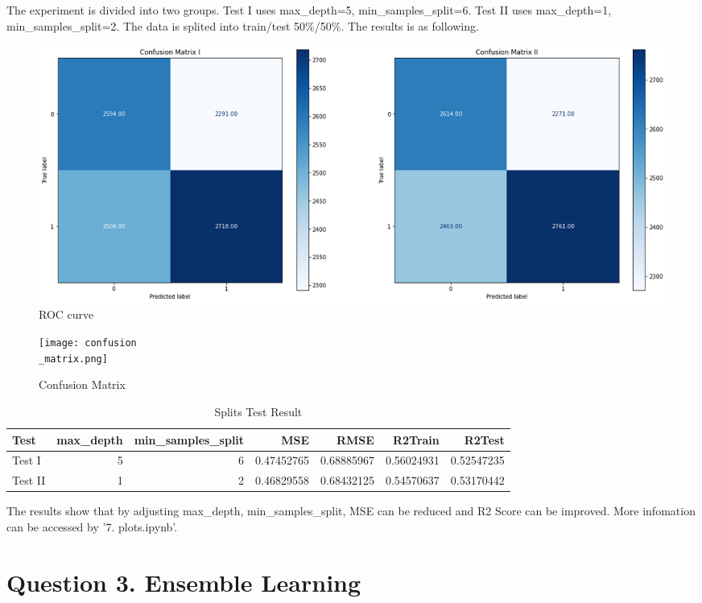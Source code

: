 \documentclass[UTF8]{ctexart}
\begin{document}
The experiment is divided into two groups. Test I uses max\_depth=5, min\_samples\_split=6. Test II uses max\_depth=1, min\_samples\_split=2. The data is splited into train/test 50\%/50\%. The results is as following.

\begin{figure}[H]
	\centerline{\includegraphics[width=1\textwidth]{ROC.png}}
	\caption{ROC curve}
\end{figure}

\begin{figure}[H]
	\centerline{\texttt{[image: confusion\\\_matrix.png]}}
	\caption{Confusion Matrix}
\end{figure}

\begin{table}[htbp]
	\centering
	\begin{tabular}{lrrrrrr}
		\toprule
		Test    & max\_depth & min\_samples\_split & MSE        & RMSE       & R2Train    & R2Test     \\
		\midrule
		Test I  & 5          & 6                   & 0.47452765 & 0.68885967 & 0.56024931 & 0.52547235 \\
		Test II & 1          & 2                   & 0.46829558 & 0.68432125 & 0.54570637 & 0.53170442 \\
		\bottomrule
	\end{tabular}
	\setlength{\abovecaptionskip}{0.3cm}
	\setlength{\belowcaptionskip}{0cm}

	\caption{Splits Test Result}
\end{table}

The results show that by adjusting max\_depth, min\_samples\_split, MSE can be reduced and R2 Score can be improved. More infomation can be accessed by '7. plots.ipynb'.

\section*{Question 3. Ensemble Learning}
\end{document}

